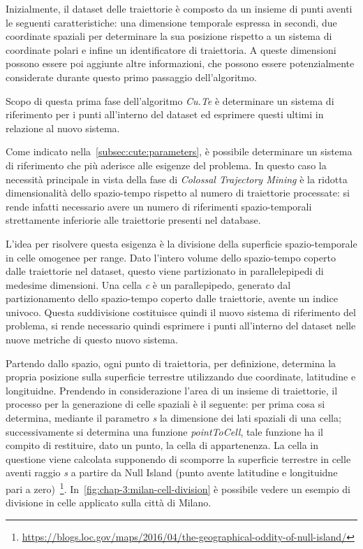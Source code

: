 Inizialmente, il dataset delle traiettorie è composto da un insieme di punti aventi le seguenti caratteristiche:
una dimensione temporale espressa in secondi, due coordinate spaziali per determinare la sua posizione rispetto a un sistema di coordinate polari e
infine un identificatore di traiettoria. A queste dimensioni possono essere poi aggiunte altre informazioni, che possono essere potenzialmente considerate durante questo primo passaggio dell'algoritmo.

Scopo di questa prima fase dell'algoritmo \textit{Cu.Te} è determinare un sistema di riferimento per i punti all'interno del dataset ed esprimere questi ultimi in
relazione al nuovo sistema.

Come indicato nella~\cref{subsec:cute:parameters}, è possibile determinare un sistema di riferimento che più aderisce alle esigenze del problema.
In questo caso la necessità principale in vista della fase di \textit{Colossal Trajectory Mining} è la ridotta dimensionalità dello spazio-tempo rispetto al numero di traiettorie
processate: si rende infatti necessario avere un numero di riferimenti spazio-temporali strettamente inferiorie alle traiettorie presenti nel database.

L'idea per risolvere questa esigenza è la divisione della superficie spazio-temporale in celle omogenee per range. Dato l'intero volume dello spazio-tempo
coperto dalle traiettorie nel dataset, questo viene partizionato in parallelepipedi di medesime dimensioni. Una cella \textit{c} è un parallepipedo, generato dal
partizionamento dello spazio-tempo coperto dalle traiettorie, avente un indice univoco.
Questa suddivisione costituisce quindi il nuovo sistema di riferimento del problema, si rende necessario quindi esprimere i punti all'interno del dataset nelle nuove
metriche di questo nuovo sistema.

Partendo dallo spazio, ogni punto di traiettoria, per definizione, determina la propria posizione sulla superficie terrestre utilizzando due coordinate, latitudine e longituidne.
Prendendo in considerazione l'area di un insieme di traiettorie, il processo per la generazione di celle spaziali è il seguente: per prima cosa si determina, mediante
il parametro \textit{s} la dimensione dei lati spaziali di una cella; successivamente si determina una funzione \textit{pointToCell}, tale funzione ha il compito
di restituire, dato un punto, la cella di appartenenza. La cella in questione viene calcolata supponendo di scomporre la superficie terrestre in celle aventi raggio \textit{s}
a partire da Null Island (punto avente latitudine e longituidne pari a zero)~\footnote{\url{https://blogs.loc.gov/maps/2016/04/the-geographical-oddity-of-null-island/}}.
In~\cref{fig:chap-3:milan-cell-division} è possibile vedere un esempio di divisione in celle applicato sulla città di Milano.

